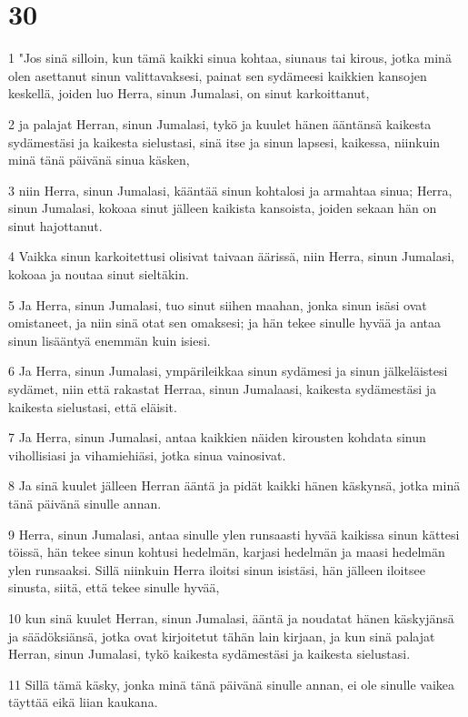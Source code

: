 \chapter{30}

\par 1 "Jos sinä silloin, kun tämä kaikki sinua kohtaa, siunaus tai kirous, jotka minä olen asettanut sinun valittavaksesi, painat sen sydämeesi kaikkien kansojen keskellä, joiden luo Herra, sinun Jumalasi, on sinut karkoittanut,
\par 2 ja palajat Herran, sinun Jumalasi, tykö ja kuulet hänen ääntänsä kaikesta sydämestäsi ja kaikesta sielustasi, sinä itse ja sinun lapsesi, kaikessa, niinkuin minä tänä päivänä sinua käsken,
\par 3 niin Herra, sinun Jumalasi, kääntää sinun kohtalosi ja armahtaa sinua; Herra, sinun Jumalasi, kokoaa sinut jälleen kaikista kansoista, joiden sekaan hän on sinut hajottanut.
\par 4 Vaikka sinun karkoitettusi olisivat taivaan äärissä, niin Herra, sinun Jumalasi, kokoaa ja noutaa sinut sieltäkin.
\par 5 Ja Herra, sinun Jumalasi, tuo sinut siihen maahan, jonka sinun isäsi ovat omistaneet, ja niin sinä otat sen omaksesi; ja hän tekee sinulle hyvää ja antaa sinun lisääntyä enemmän kuin isiesi.
\par 6 Ja Herra, sinun Jumalasi, ympärileikkaa sinun sydämesi ja sinun jälkeläistesi sydämet, niin että rakastat Herraa, sinun Jumalaasi, kaikesta sydämestäsi ja kaikesta sielustasi, että eläisit.
\par 7 Ja Herra, sinun Jumalasi, antaa kaikkien näiden kirousten kohdata sinun vihollisiasi ja vihamiehiäsi, jotka sinua vainosivat.
\par 8 Ja sinä kuulet jälleen Herran ääntä ja pidät kaikki hänen käskynsä, jotka minä tänä päivänä sinulle annan.
\par 9 Herra, sinun Jumalasi, antaa sinulle ylen runsaasti hyvää kaikissa sinun kättesi töissä, hän tekee sinun kohtusi hedelmän, karjasi hedelmän ja maasi hedelmän ylen runsaaksi. Sillä niinkuin Herra iloitsi sinun isistäsi, hän jälleen iloitsee sinusta, siitä, että tekee sinulle hyvää,
\par 10 kun sinä kuulet Herran, sinun Jumalasi, ääntä ja noudatat hänen käskyjänsä ja säädöksiänsä, jotka ovat kirjoitetut tähän lain kirjaan, ja kun sinä palajat Herran, sinun Jumalasi, tykö kaikesta sydämestäsi ja kaikesta sielustasi.
\par 11 Sillä tämä käsky, jonka minä tänä päivänä sinulle annan, ei ole sinulle vaikea täyttää eikä liian kaukana.
